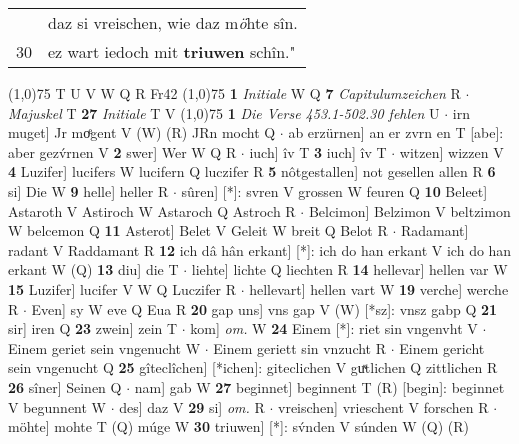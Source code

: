 \documentclass[8pt,a4paper,notitlepage]{article}
\begin{document}
\begin{table}[ht]
\begin{minipage}[t]{0.5\linewidth}
\begin{tabular}{rl}
 & daz si vreischen, wie daz m\textit{ö}hte sîn.\\ 
30 & ez wart iedoch mit \textbf{triuwen} schîn."\\ 
\end{tabular}
\scriptsize
\line(1,0){75} \newline
T U V W Q R Fr42 \newline
\line(1,0){75} \newline
\textbf{1} \textit{Initiale} W Q  \textbf{7} \textit{Capitulumzeichen} R   $\cdot$ \textit{Majuskel} T  \textbf{27} \textit{Initiale} T V  \newline
\line(1,0){75} \newline
\textbf{1} \textit{Die Verse 453.1-502.30 fehlen} U   $\cdot$ irn muget] Jr moͤgent V (W) (R) JRn mocht Q  $\cdot$ ab erzürnen] an er zvrn en T [abe]: aber gezv́rnen V \textbf{2} swer] Wer W Q R  $\cdot$ iuch] îv T \textbf{3} iuch] îv T  $\cdot$ witzen] wizzen V \textbf{4} Luzifer] lucifers W lucifern Q luczifer R \textbf{5} nôtgestallen] not gesellen allen R \textbf{6} si] Die W \textbf{9} helle] heller R  $\cdot$ sûren] [*]: svren V grossen W feuren Q \textbf{10} Beleet] Astaroth V Astiroch W Astaroch Q Astroch R  $\cdot$ Belcimon] Belzimon V beltzimon W belcemon Q \textbf{11} Asterot] Belet V Geleit W breit Q Belot R  $\cdot$ Radamant] radant V Raddamant R \textbf{12} ich dâ hân erkant] [*]: ich do han erkant V ich do han erkant W (Q) \textbf{13} diu] die T  $\cdot$ liehte] lichte Q liechten R \textbf{14} hellevar] hellen var W \textbf{15} Luzifer] lucifer V W Q Luczifer R  $\cdot$ hellevart] hellen vart W \textbf{19} verche] werche R  $\cdot$ Even] sy W eve Q Eua R \textbf{20} gap uns] vns gap V (W) [*sz]: vnsz gabp Q \textbf{21} sir] iren Q \textbf{23} zwein] zein T  $\cdot$ kom] \textit{om.} W \textbf{24} Einem [*]: riet sin vngenvht V  $\cdot$ Einem geriet sein vngenucht W  $\cdot$ Einem geriett sin vnzucht R  $\cdot$ Einem gericht sein vngenucht Q \textbf{25} gîteclîchen] [*ichen]: giteclichen V guͯtlichen Q zittlichen R \textbf{26} sîner] Seinen Q  $\cdot$ nam] gab W \textbf{27} beginnet] beginnent T (R) [begin]: beginnet  V begunnent W  $\cdot$ des] daz V \textbf{29} si] \textit{om.} R  $\cdot$ vreischen] vrieschent V forschen R  $\cdot$ möhte] mohte T (Q) múge W \textbf{30} triuwen] [*]: sv́nden V súnden W (Q) (R) \newline
\end{minipage}
\end{table}
\end{document}
